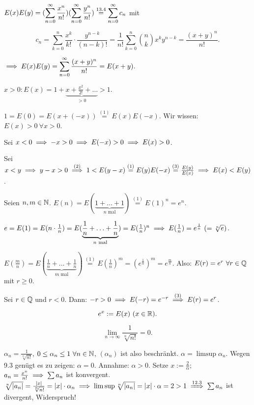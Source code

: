 \documentclass[a4paper,twoside,DIV15,BCOR12mm]{scrbook}
\begin{document}
\begin{beweise}
\item $\displaystyle{E(x)E(y) = (\sum_{n=0}^{\infty}{\frac{x^n}{n!}})(\sum_{n=0}^{\infty}{\frac{y^n}{n!}}) \overset{\text{13.4}}{=} \sum_{n=0}^{\infty}{c_n}}$ mit

$$c_n = \sum_{k=0}^{n}{\frac{x^k}{k!}\cdot\frac{y^{n-k}}{(n-k)!}} = \frac{1}{n!} \sum_{k=0}^{n}{\binom{n}{k} x^k y^{n-k}} = \frac{(x+y)^n}{n!}.$$

$\displaystyle{\ensuremath{\implies}E(x)E(y) = \sum_{n=0}^{\infty}{\frac{(x+y)^n}{n!}} = E(x+y).}$

\item $x>0: E(x) = 1+\underbrace{x+\frac{x^2}{2!}+\ldots}_{>0} > 1$.

\item $1 = E(0) = E(x+(-x)) \overset{(1)}{=} E(x)E(-x)$. Wir wissen: $E(x)>0\ \forall x>0$.

Sei $x<0 \implies -x>0 \implies E(-x)>0 \implies E(x)>0$.

\item Sei $x<y \implies y-x>0 \overset{(2)}{\implies} 1<E(y-x) \overset{(1)}{=} E(y)E(-x) \overset{(3)}{=} \frac{E(y)}{E(x)} \implies E(x)<E(y)$.

\item Seien $n,m\in\mathbb{N}$. $E(n) = E(\underbrace{1+\ldots+1}_{n\text{ mal}}) \overset{(1)}{=} E(1)^n = e^n$.

$e = E(1) = E(n\cdot\frac{1}{n}) = E(\underbrace{\frac{1}{n}+\ldots+\frac{1}{n}}_{n\text{ mal}}) = E(\frac{1}{n})^n \implies E(\frac{1}{n}) = e^{\frac{1}{n}}\ (= \sqrt[n]{e})$.

$E(\frac{m}{n}) = E(\underbrace{\frac{1}{n}+\ldots+\frac{1}{n}}_{m\text{ mal}}) \overset{(1)}{=} E(\frac{1}{n})^m = (e^{\frac{1}{n}})^m = e^{\frac{m}{n}}$. Also: $E(r) = e^r\ \forall r\in\mathbb{Q}$ mit $r \ge 0$.

Sei $r\in\mathbb{Q}$ und $r<0$. Dann: $-r>0 \implies E(-r) = e^{-r} \overset{(3)}{\implies} E(r) = e^r$.
\end{beweise}

\begin{definition}[$e^x$]
\begin{equation*}
e^x := E(x)\ (x\in\mathbb{R}).
\end{equation*}
\end{definition}

\begin{wichtigerhilfssatz}
$$\lim_{n\to\infty}{\frac{1}{\sqrt[n]{n!}}} = 0.$$
\end{wichtigerhilfssatz}

\begin{beweis}
$\alpha_n = \frac{1}{\sqrt[n]{n!}}$, $0\le \alpha_n \le 1 \ \forall n\in\mathbb{N}$, $(\alpha_n)$ ist also beschränkt.
$\alpha = \limsup \alpha_n$. Wegen 9.3 genügt es zu zeigen: $\alpha = 0$. Annahme: $\alpha > 0$. Setze $x:= \frac{2}{\alpha}$; $a_n = \frac{x^n}{n!} \implies \sum{a_n}$ ist konvergent. $\sqrt[n]{|a_n|} = \frac{|x|}{\sqrt[n]{n!}} = |x|\cdot\alpha_n \folgt \limsup \sqrt[n]{|a_n|} = |x|\cdot\alpha = 2>1 \folgtnach{12.3} \sum{a_n}$ ist divergent, Widerspruch!
\end{beweis}
\end{document}
